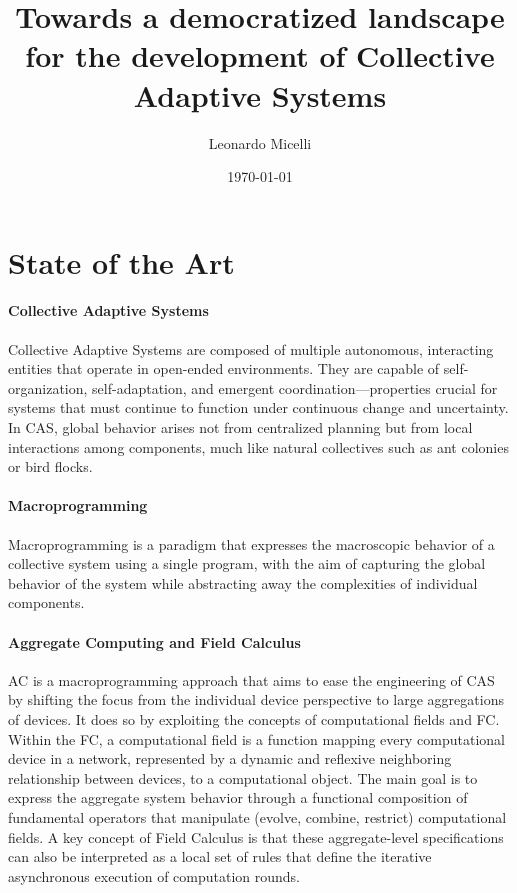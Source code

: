 \documentclass[12pt]{article}
\begin{document}
\title{Towards a democratized landscape for the development of Collective Adaptive Systems}
\author{Leonardo Micelli}
\date{\today}
\maketitle

\noindent


\newpage
\setcounter{tocdepth}{2}

\setlength{\parindent}{0em}
\setlength{\parskip}{1em}

\newpage
\section{State of the Art}
\paragraph{\textbf{Collective Adaptive Systems}} Collective Adaptive Systems are composed of multiple autonomous, interacting entities that operate in open-ended environments. 
They are capable of self-organization, self-adaptation, and emergent coordination—properties crucial for systems that must continue to function under continuous change and uncertainty.
In CAS, global behavior arises not from centralized planning but from local interactions among components, much like natural collectives such as ant colonies or bird flocks.

\paragraph{\textbf{Macroprogramming}} Macroprogramming\cite{10.1145/3579353} is a paradigm that expresses the macroscopic behavior of a collective system using a single program, with the aim of
capturing the global behavior of the system while abstracting away the complexities of individual components.

\paragraph{\textbf{Aggregate Computing and Field Calculus}} AC\cite{beal2016aggregate} is a macroprogramming approach that aims to ease the engineering of CAS by shifting the
focus from the individual device perspective to large aggregations of devices. It does so by exploiting the concepts of computational fields and FC.
Within the FC, a computational field is a function mapping every computational device in a network, represented by a dynamic and reflexive neighboring
relationship between devices, to a computational object. The main goal is to express the aggregate system behavior
through a functional composition of fundamental operators that manipulate (evolve, combine, restrict)
computational fields. A key concept of Field Calculus is that these aggregate-level specifications can
also be interpreted as a local set of rules that define the iterative asynchronous execution of computation rounds.
\end{document}
